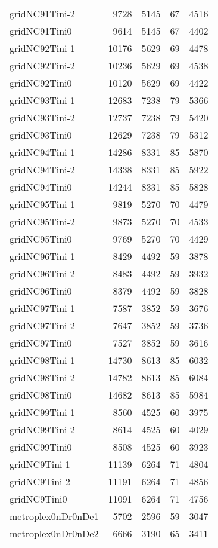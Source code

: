 \documentclass[../../../thesis.tex]{subfiles}
\begin{document}
\begin{longtable}{lrrrr}
gridNC91Tini-2 & 9728 & 5145 & 67 & 4516 \\
gridNC91Tini0 & 9614 & 5145 & 67 & 4402 \\
gridNC92Tini-1 & 10176 & 5629 & 69 & 4478 \\
gridNC92Tini-2 & 10236 & 5629 & 69 & 4538 \\
gridNC92Tini0 & 10120 & 5629 & 69 & 4422 \\
gridNC93Tini-1 & 12683 & 7238 & 79 & 5366 \\
gridNC93Tini-2 & 12737 & 7238 & 79 & 5420 \\
gridNC93Tini0 & 12629 & 7238 & 79 & 5312 \\
gridNC94Tini-1 & 14286 & 8331 & 85 & 5870 \\
gridNC94Tini-2 & 14338 & 8331 & 85 & 5922 \\
gridNC94Tini0 & 14244 & 8331 & 85 & 5828 \\
gridNC95Tini-1 & 9819 & 5270 & 70 & 4479 \\
gridNC95Tini-2 & 9873 & 5270 & 70 & 4533 \\
gridNC95Tini0 & 9769 & 5270 & 70 & 4429 \\
gridNC96Tini-1 & 8429 & 4492 & 59 & 3878 \\
gridNC96Tini-2 & 8483 & 4492 & 59 & 3932 \\
gridNC96Tini0 & 8379 & 4492 & 59 & 3828 \\
gridNC97Tini-1 & 7587 & 3852 & 59 & 3676 \\
gridNC97Tini-2 & 7647 & 3852 & 59 & 3736 \\
gridNC97Tini0 & 7527 & 3852 & 59 & 3616 \\
gridNC98Tini-1 & 14730 & 8613 & 85 & 6032 \\
gridNC98Tini-2 & 14782 & 8613 & 85 & 6084 \\
gridNC98Tini0 & 14682 & 8613 & 85 & 5984 \\
gridNC99Tini-1 & 8560 & 4525 & 60 & 3975 \\
gridNC99Tini-2 & 8614 & 4525 & 60 & 4029 \\
gridNC99Tini0 & 8508 & 4525 & 60 & 3923 \\
gridNC9Tini-1 & 11139 & 6264 & 71 & 4804 \\
gridNC9Tini-2 & 11191 & 6264 & 71 & 4856 \\
gridNC9Tini0 & 11091 & 6264 & 71 & 4756 \\
metroplex0nDr0nDe1 & 5702 & 2596 & 59 & 3047 \\
metroplex0nDr0nDe2 & 6666 & 3190 & 65 & 3411 \\

\end{longtable}
\end{document}
